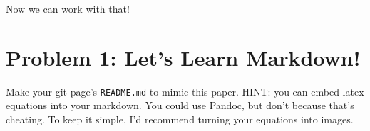 \documentclass{article}
\begin{document}
Now we can work with that!

\section*{Problem 1: Let’s Learn Markdown!}
Make your git page’s \texttt{README.md} to mimic this paper. HINT: you can embed latex equations into your markdown. You could use Pandoc, but don’t because that’s cheating. To keep it simple, I’d recommend turning your equations into images.
\end{document}
